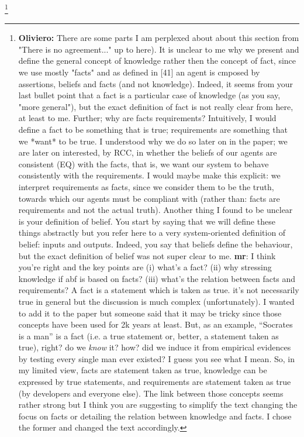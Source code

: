 \documentclass[conference]{IEEEtran}
\newcommand{\fixnote}[2]{\textbf{\color{red}{FIX}}\footnote{{\bf #1:} #2}}
\begin{document}
\fixnote{Oliviero}{There are some parts I am perplexed about about this section from "There is no agreement..." up to here). It is unclear to me why we present and define the general concept of knowledge rather then the concept of fact, since we use mostly "facts" and as defined in [41] an agent is cmposed by assertions, beliefs and facts (and not knowledge). Indeed, it seems from your last bullet point that a fact is a particular case of knowledge (as you say, "more general"), but the exact definition of fact is not really clear from here, at least to me. Further; why are facts requirements? Intuitively, I would define a fact to be something that is true; requirements are something that we *want* to be true. I understood why we do so later on in the paper; we are later on interested, by RCC, in whether the beliefs of our agents are consistent (EQ) with the facts, that is, we want our system to behave consistently with the requirements. I would maybe make this explicit: we interpret requirements as facts, since we consider them to be the truth, towards which our agents must be compliant with (rather than: facts are requirements and not the actual truth). Another thing I found to be unclear is your definition of belief. You start by saying that we will define these things abstractly but you refer here to a very system-oriented definition of belief: inputs and outputs. Indeed, you say that beliefs define the behaviour, but the exact definition of belief was not super clear to me. {\bf mr}: I think you're right and the key points are (i) what's a fact? (ii) why stressing knowledge if abf is based on facts? (iii) what's the relation between facts and requirements? A fact is a statement which is taken as true. it's not necessarily true in general but the discussion is much complex (unfortunately). I wanted to add it to the paper but someone said that it may be tricky since those concepts have been used for 2k years at least. But, as an example, ``Socrates is a man'' is a fact (i.e. a true statement or, better, a statement taken as true), right? do we \emph{know} it? how? did we induce it from empirical evidences by testing every single man ever existed? I guess you see what I mean. So, in my limited view, facts are statement taken as true, knowledge can be expressed by true statements, and requirements are statement taken as true (by developers and everyone else). The link between those concepts seems rather strong but I think you are suggesting to simplify the text changing the focus on facts or detailing the relation between knowledge and facts. I chose the former and changed the text accordingly.}
\end{document}
